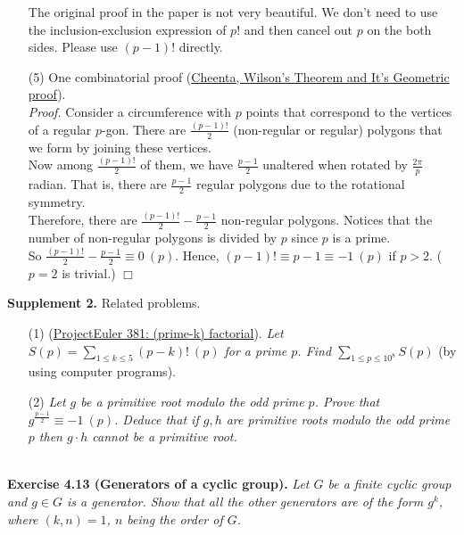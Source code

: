 \documentclass{article}
\begin{document}
\begin{enumerate}
The original proof in the paper is not very beautiful.
We don't need to use the inclusion-exclusion expression of $p!$
and then cancel out $p$ on the both sides. Please use $(p - 1)!$ directly.
\item[(5)]
One combinatorial proof
(\href{https://www.youtube.com/watch?v=4qbh7mC6YCY}
{Cheenta, Wilson's Theorem and It's Geometric proof}). \\
\emph{Proof.}
Consider a circumference with $p$ points that correspond to the vertices of a regular $p$-gon.
There are $\frac{(p - 1)!}{2}$ (non-regular or regular) polygons
that we form by joining these vertices. \\

Now among $\frac{(p - 1)!}{2}$ of them, we have $\frac{p - 1}{2}$ unaltered
when rotated by $\frac{2 \pi}{p}$ radian.
That is, there are $\frac{p - 1}{2}$ regular polygons due to the rotational symmetry. \\

Therefore, there are $\frac{(p - 1)!}{2} - \frac{p - 1}{2}$ non-regular polygons.
Notices that the number of non-regular polygons is divided by $p$ since $p$ is a prime. \\

So $\frac{(p - 1)!}{2} - \frac{p - 1}{2} \equiv 0 \: (p)$.
Hence, $(p - 1)! \equiv p - 1 \equiv -1 \: (p)$ if $p > 2$. ($p = 2$ is trivial.)
$\Box$ \\

\end{enumerate}

\textbf{Supplement 2.} Related problems.
\begin{enumerate}
\item[(1)]
(\href{https://projecteuler.net/problem=381}
{ProjectEuler 381: (prime-k) factorial}).
\emph{Let $S(p) = \sum_{1 \leq k \leq 5}(p-k)! \: (p)$ for a prime $p$.
Find $\sum_{1 \leq p \leq {10}^8} S(p)$} (by using computer programs).
\item[(2)]
\emph{Let $g$ be a primitive root modulo the odd prime $p$.
Prove that $g^{\frac{p - 1}{2}} \equiv -1 \: (p)$.
Deduce that if $g, h$ are primitive roots modulo the odd prime $p$
then $g \cdot h$ cannot be a primitive root.} \\\\
\end{enumerate}



\textbf{Exercise 4.13 (Generators of a cyclic group).}
\emph{Let $G$ be a finite cyclic group and $g \in G$ is a generator.
Show that all the other generators are of the form $g^k$,
where $(k, n) = 1$, $n$ being the order of $G$.} \\
\end{document}
